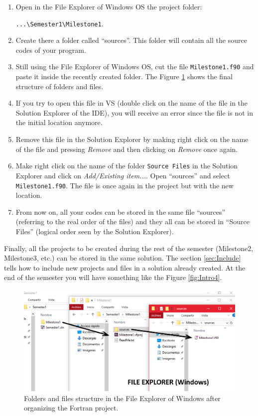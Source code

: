\begin{enumerate}[nosep]
    \item Open in the File Explorer of Windows OS the project folder:
    
        \texttt{...\textbackslash Semester1\textbackslash Milestone1}.
    
    \item Create there a folder called ``sources''. This folder will contain all the source codes of your program. 
    \item Still using the File Explorer of Windows OS, cut the file \texttt{Milestone1.f90} and paste it inside the recently created folder. The Figure \ref{fig:Intro3} shows the final structure of folders and files.
    \item If you try to open this file in VS (double click on the name of the file in the Solution Explorer of the IDE), you will receive an error since the file is not in the initial location anymore. 
    \item Remove this file in the Solution Explorer by making right click on the name of the file and pressing \textit{Remove} and then clicking on \textit{Remove} once again.
    \item Make right click on the name of the folder \texttt{Source Files} in the Solution Explorer and click on \textit{Add/Existing item...}. Open ``sources'' and select \texttt{Milestone1.f90}. The file is once again in the project but with the new location. 
    \item From now on, all your codes can be stored in the same file ``sources'' (referring to the real order of the files) and they all can be stored in ``Source Files'' (logical order seen by the Solution Explorer). 
\end{enumerate}

Finally, all the projects to be created during the rest of the semester (Milestone2, Milestone3, etc.) can be stored in the same solution. The section \ref{sec:Include} tells how to include new projects and files in a solution already created. At the end of the semester you will have something like the Figure \ref{fig:Intro4}.

\begin{figure}
    \centering
    \includegraphics[width=  \textwidth]{Figures/Intro3}
    \caption{Folders and files structure in the File Explorer of Windows after organizing the Fortran project.}
    \label{fig:Intro3}
\end{figure}

